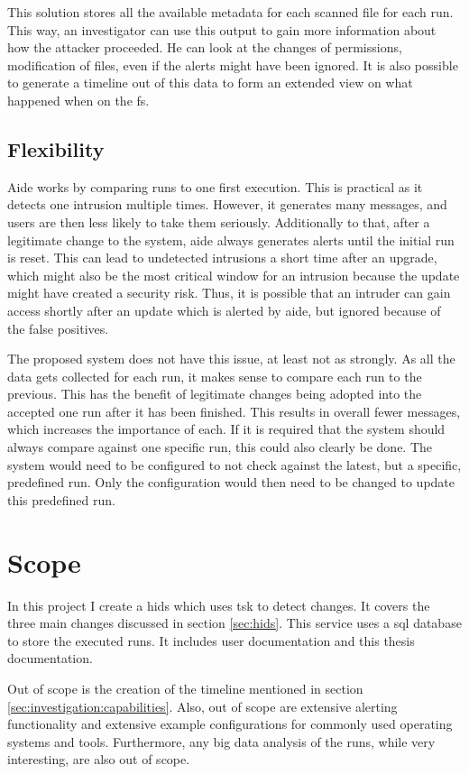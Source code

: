 This solution stores all the available \gls{metadata} for each scanned file for each run. This way, an investigator can use this output to gain more information about how the attacker proceeded. He can look at the changes of permissions, modification of files, even if the alerts might have been ignored. It is also possible to generate a timeline out of this data to form an extended view on what happened when on the \gls{fs}. 

\subsection{Flexibility}

Aide works by comparing runs to one first execution. This is practical as it detects one intrusion multiple times. However, it generates many messages, and users are then less likely to take them seriously. Additionally to that, after a legitimate change to the system, aide always generates alerts until the initial run is reset. This can lead to undetected intrusions a short time after an upgrade, which might also be the most critical window for an intrusion because the update might have created a security risk. Thus, it is possible that an intruder can gain access shortly after an update which is alerted by aide, but ignored because of the false positives.

The proposed system does not have this issue, at least not as strongly. As all the data gets collected for each run, it makes sense to compare each run to the previous. This has the benefit of legitimate changes being adopted into the accepted one run after it has been finished. This results in overall fewer messages, which increases the importance of each. If it is required that the system should always compare against one specific run, this could also clearly be done. The system would need to be configured to not check against the latest, but a specific, predefined run. Only the configuration would then need to be changed to update this predefined run. 

\section{Scope}

In this project I create a \gls{hids} which uses \gls{tsk} to detect changes. It covers the three main changes discussed in section \ref{sec:hids}. This service uses a \gls{sql} database to store the executed runs. It includes user documentation and this thesis documentation. 

Out of scope is the creation of the timeline mentioned in section \ref{sec:investigation:capabilities}. Also, out of scope are extensive alerting functionality and extensive example configurations for commonly used operating systems and tools. Furthermore, any big data analysis of the runs, while very interesting, are also out of scope.

